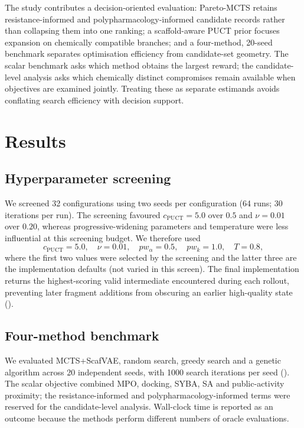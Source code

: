 \documentclass[10pt,a4paper]{article}
\begin{document}
The study contributes a decision-oriented evaluation: Pareto-MCTS retains resistance-informed and polypharmacology-informed candidate records rather than collapsing them into one ranking; a scaffold-aware PUCT prior focuses expansion on chemically compatible branches; and a four-method, \num{20}-seed benchmark separates optimisation efficiency from candidate-set geometry. The scalar benchmark asks which method obtains the largest reward; the candidate-level analysis asks which chemically distinct compromises remain available when objectives are examined jointly. Treating these as separate estimands avoids conflating search efficiency with decision support.

\section{Results}

\subsection{Hyperparameter screening}
\label{sec:hparam}

We screened \num{32} configurations using two seeds per configuration (\num{64} runs; \num{30} iterations per run). The screening favoured $c_{\text{PUCT}}=\num{5.0}$ over $\num{0.5}$ and $\nu=\num{0.01}$ over $\num{0.20}$, whereas progressive-widening parameters and temperature were less influential at this screening budget. We therefore used
\[
c_{\text{PUCT}}=\num{5.0},\quad
\nu=\num{0.01},\quad
pw_{\alpha}=\num{0.5},\quad
pw_{k}=\num{1.0},\quad
T=\num{0.8},
\]
where the first two values were selected by the screening and the latter three are the implementation defaults (not varied in this screen).
The final implementation returns the highest-scoring valid intermediate encountered during each rollout, preventing later fragment additions from obscuring an earlier high-quality state ().

\subsection{Four-method benchmark}
\label{sec:benchmark}

We evaluated MCTS+ScafVAE, random search, greedy search and a genetic algorithm across \num{20} independent seeds, with \num{1000} search iterations per seed (). The scalar objective combined MPO, docking, SYBA, SA and public-activity proximity; the resistance-informed and polypharmacology-informed terms were reserved for the candidate-level analysis. Wall-clock time is reported as an outcome because the methods perform different numbers of oracle evaluations.
\end{document}
